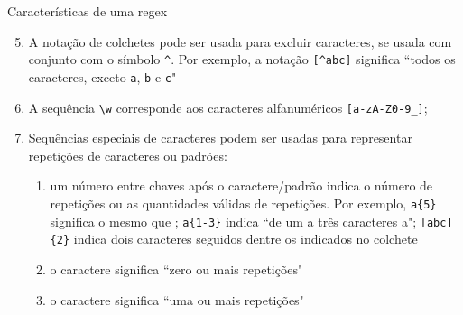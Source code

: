 \begin{frame}[fragile]{Características de uma regex}

    \begin{enumerate}
        \setcounter{enumi}{4}

        \item A notação de colchetes pode ser usada para excluir caracteres, se usada com conjunto com o símbolo \verb|^|. Por exemplo, a notação \verb|[^abc]| significa ``todos os caracteres, exceto \texttt{a}, \texttt{b} e \texttt{c}"
        \pause
        \item A sequência \verb|\w| corresponde aos caracteres alfanuméricos \verb|[a-zA-Z0-9_]|;
        \pause
        \item Sequências especiais de caracteres podem ser usadas para representar repetições de caracteres ou padrões:
        \pause
        \begin{enumerate}
            \item um número entre chaves após o caractere/padrão indica o número de repetições ou 
                as quantidades válidas de repetições. Por exemplo, \verb|a{5}| significa o mesmo 
                que ; \verb|a{1-3}| indica ``de um a três caracteres a"; 
                \verb|[abc]{2}| indica dois caracteres seguidos dentre os indicados no colchete
        \pause
            \item o caractere  significa ``zero ou mais repetições"
        \pause
            \item o caractere  significa ``uma ou mais repetições"

        \end{enumerate}
    \end{enumerate}

\end{frame}

